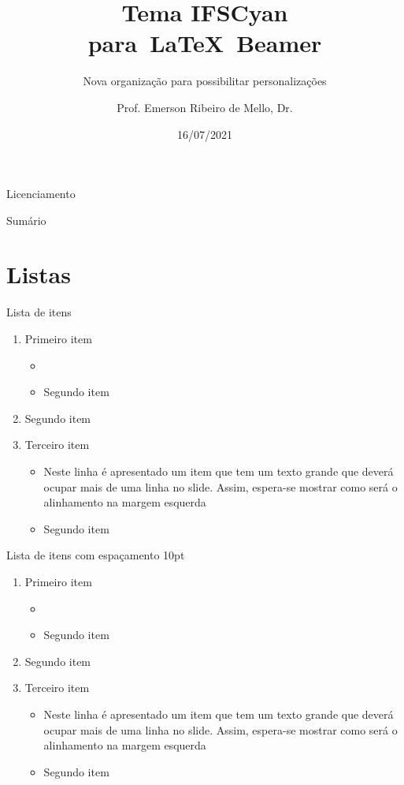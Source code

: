 \documentclass{beamer}
\title{Tema IFSCyan para~\LaTeX~Beamer}
\subtitle{Nova organização para possibilitar personalizações}
\author{Prof. Emerson Ribeiro de Mello, Dr.}
\institute{%
\url{mello@ifsc.edu.br}%
}%
\date{16/07/2021}
\begin{document}
\begin{frame}[plain]
    \titlepage
\end{frame}

\begin{frame}{Licenciamento}
    \licenciamentoLivre
\end{frame}

\begin{frame}{Sumário}
    \tableofcontents
\end{frame}



\section{Listas}


\begin{frame}{Lista de itens}
    \begin{enumerate}
        \item Primeiro item
        \begin{itemize}
            \item {}
            \item Segundo item
        \end{itemize}
        \item Segundo item
        \item Terceiro item 
        \begin{itemize}
            \item Neste linha é apresentado um item que tem um texto grande que deverá ocupar mais de uma linha no slide. Assim, espera-se mostrar como será o alinhamento na margem esquerda
            \item Segundo item
        \end{itemize}
    \end{enumerate}
\end{frame}

\begin{frame}[wide]{Lista de itens com espaçamento 10pt}
    \begin{enumerate}
        \item Primeiro item
        \begin{itemize}
            \item {}
            \item Segundo item
        \end{itemize}
        \item Segundo item
        \item Terceiro item 
        \begin{itemize}
            \item Neste linha é apresentado um item que tem um texto grande que deverá ocupar mais de uma linha no slide. Assim, espera-se mostrar como será o alinhamento na margem esquerda
            \item Segundo item
        \end{itemize}
    \end{enumerate}
\end{frame}
\end{document}
